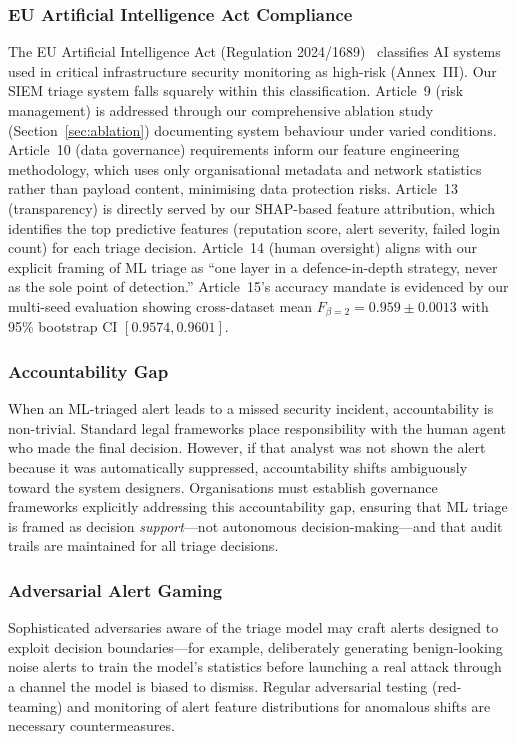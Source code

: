 \documentclass[conference]{IEEEtran}
\begin{document}
\subsubsection{EU Artificial Intelligence Act Compliance}
The EU Artificial Intelligence Act (Regulation 2024/1689)~\cite{euaiact2024} classifies AI
systems used in critical infrastructure security monitoring as high-risk (Annex~III).
Our SIEM triage system falls squarely within this classification.
Article~9 (risk management) is addressed through our comprehensive ablation study
(Section~\ref{sec:ablation}) documenting system behaviour under varied conditions.
Article~10 (data governance) requirements inform our feature engineering methodology,
which uses only organisational metadata and network statistics rather than payload content,
minimising data protection risks.
Article~13 (transparency) is directly served by our SHAP-based feature attribution,
which identifies the top predictive features (reputation score, alert severity, failed
login count) for each triage decision.
Article~14 (human oversight) aligns with our explicit framing of ML triage as
``one layer in a defence-in-depth strategy, never as the sole point of detection.''
Article~15's accuracy mandate is evidenced by our multi-seed evaluation showing
cross-dataset mean $F_{\beta=2} = 0.959 \pm 0.0013$ with 95\% bootstrap CI $[0.9574, 0.9601]$.

\subsubsection{Accountability Gap}
When an ML-triaged alert leads to a missed security incident, accountability is non-trivial.
Standard legal frameworks place responsibility with the human agent who made the final decision.
However, if that analyst was not shown the alert because it was automatically suppressed,
accountability shifts ambiguously toward the system designers.
Organisations must establish governance frameworks explicitly addressing this accountability
gap, ensuring that ML triage is framed as decision \emph{support}---not autonomous
decision-making---and that audit trails are maintained for all triage decisions.

\subsubsection{Adversarial Alert Gaming}
Sophisticated adversaries aware of the triage model may craft alerts designed to exploit
decision boundaries---for example, deliberately generating benign-looking noise alerts to
train the model's statistics before launching a real attack through a channel the model
is biased to dismiss.
Regular adversarial testing (red-teaming) and monitoring of alert feature distributions
for anomalous shifts are necessary countermeasures.
\end{document}
